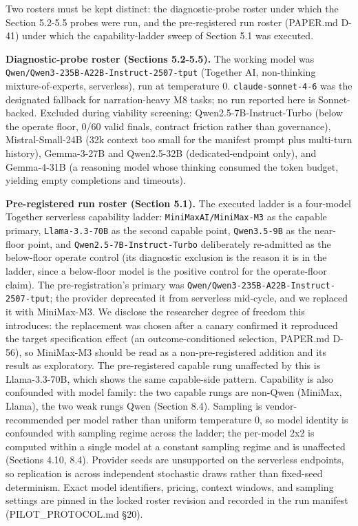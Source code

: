 \documentclass[
]{article}
\begin{document}
Two rosters must be kept distinct: the diagnostic-probe roster under
which the Section 5.2-5.5 probes were run, and the pre-registered run
roster (PAPER.md D-41) under which the capability-ladder sweep of
Section 5.1 was executed.

\textbf{Diagnostic-probe roster (Sections 5.2-5.5).} The working model
was \texttt{Qwen/Qwen3-235B-A22B-Instruct-2507-tput} (Together AI,
non-thinking mixture-of-experts, serverless), run at temperature 0.
\texttt{claude-sonnet-4-6} was the designated fallback for
narration-heavy M8 tasks; no run reported here is Sonnet-backed.
Excluded during viability screening: Qwen2.5-7B-Instruct-Turbo (below
the operate floor, 0/60 valid finals, contract friction rather than
governance), Mistral-Small-24B (32k context too small for the manifest
prompt plus multi-turn history), Gemma-3-27B and Qwen2.5-32B
(dedicated-endpoint only), and Gemma-4-31B (a reasoning model whose
thinking consumed the token budget, yielding empty completions and
timeouts).

\textbf{Pre-registered run roster (Section 5.1).} The executed ladder is
a four-model Together serverless capability ladder:
\texttt{MiniMaxAI/MiniMax-M3} as the capable primary,
\texttt{Llama-3.3-70B} as the second capable point, \texttt{Qwen3.5-9B}
as the near-floor point, and \texttt{Qwen2.5-7B-Instruct-Turbo}
deliberately re-admitted as the below-floor operate control (its
diagnostic exclusion is the reason it is in the ladder, since a
below-floor model is the positive control for the operate-floor claim).
The pre-registration's primary was
\texttt{Qwen/Qwen3-235B-A22B-Instruct-2507-tput}; the provider
deprecated it from serverless mid-cycle, and we replaced it with
MiniMax-M3. We disclose the researcher degree of freedom this
introduces: the replacement was chosen after a canary confirmed it
reproduced the target specification effect (an outcome-conditioned
selection, PAPER.md D-56), so MiniMax-M3 should be read as a
non-pre-registered addition and its result as exploratory. The
pre-registered capable rung unaffected by this is Llama-3.3-70B, which
shows the same capable-side pattern. Capability is also confounded with
model family: the two capable rungs are non-Qwen (MiniMax, Llama), the
two weak rungs Qwen (Section 8.4). Sampling is vendor-recommended per
model rather than uniform temperature 0, so model identity is confounded
with sampling regime across the ladder; the per-model 2x2 is computed
within a single model at a constant sampling regime and is unaffected
(Sections 4.10, 8.4). Provider seeds are unsupported on the serverless
endpoints, so replication is across independent stochastic draws rather
than fixed-seed determinism. Exact model identifiers, pricing, context
windows, and sampling settings are pinned in the locked roster revision
and recorded in the run manifest (PILOT\_PROTOCOL.md §20).
\end{document}
